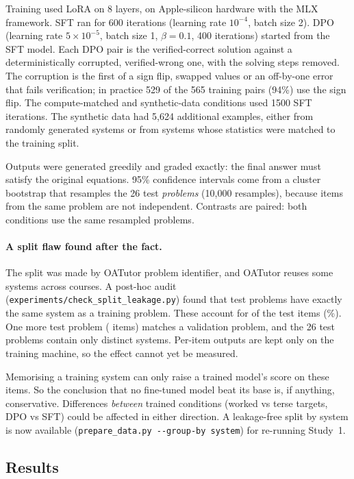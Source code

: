\documentclass[11pt,a4paper]{article}
\begin{document}
Training used LoRA \citep{hu2021lora} on 8 layers, on Apple-silicon hardware with the MLX
framework. SFT ran for 600 iterations (learning rate $10^{-4}$, batch size 2). DPO
(learning rate $5\times 10^{-5}$, batch size 1, $\beta=0.1$, 400 iterations) started from
the SFT model. Each DPO pair is the verified-correct solution against a deterministically
corrupted, verified-wrong one, with the solving steps removed. The corruption is the first
of a sign flip, swapped values or an off-by-one error that fails verification; in practice
529 of the 565 training pairs (94\%) use the sign flip. The compute-matched and synthetic-data conditions used 1500 SFT iterations.
The synthetic data had 5,624 additional examples, either from randomly generated systems or
from systems whose statistics were matched to the training split.

Outputs were generated greedily and graded exactly: the final answer must satisfy the
original equations. 95\% confidence intervals come from a cluster bootstrap that resamples
the 26 test \emph{problems} (10,000 resamples), because items from the same problem are not
independent. Contrasts are paired: both conditions use the same resampled problems.

\paragraph{A split flaw found after the fact.}
The split was made by OATutor problem identifier, and OATutor reuses some systems across
courses. A post-hoc audit (\texttt{experiments/check\_split\_leakage.py}) found that
\numLeakTestProblems{} test problems have exactly the same system as a training problem.
These account for \numLeakTestItems{} of the \numTestItems{} test items
(\numLeakTestShare\%). One more test problem (\numLeakValidItems{} items) matches a
validation problem, and the 26 test problems contain only \numDistinctTestSystems{}
distinct systems. Per-item outputs are kept only on the training machine, so the effect
cannot yet be measured.

Memorising a training system can only raise a trained model's score on these items. So the
conclusion that no fine-tuned model beat its base is, if anything, conservative. Differences
\emph{between} trained conditions (worked vs terse targets, DPO vs SFT) could be affected
in either direction. A leakage-free split by system is now available
(\texttt{prepare\_data.py -{}-group-by system}) for re-running Study~1.

\subsection{Results}
\end{document}
